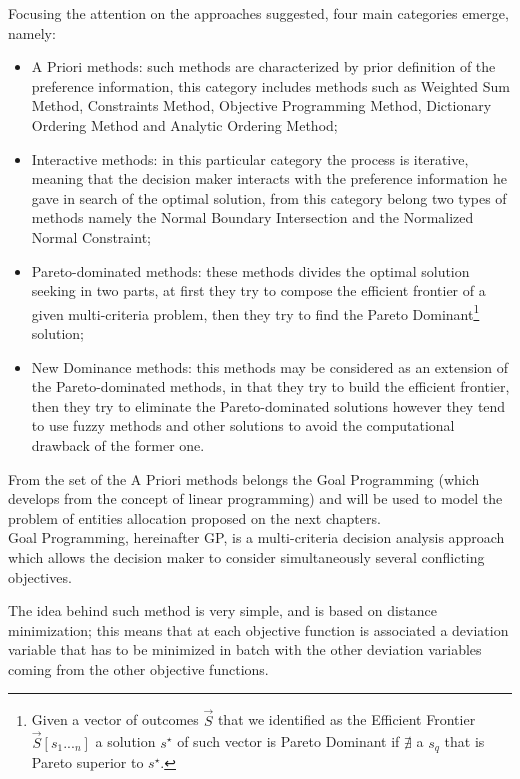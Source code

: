\begin{doublespace}
Focusing the attention on the approaches suggested, four main categories emerge, namely:

\begin{itemize}
	\item A Priori methods: such methods are characterized by prior definition of the preference information, this category includes methods such as Weighted Sum Method, Constraints Method, Objective Programming Method, Dictionary Ordering Method and Analytic Ordering Method;   
	\item Interactive methods: in this particular category the process is iterative, meaning that the decision maker interacts with the preference information he gave in search of the optimal solution, from this category belong two types of methods namely the Normal Boundary Intersection and the Normalized Normal Constraint;
	\item Pareto-dominated methods: these methods divides the optimal solution seeking in two parts, at first they try to compose the efficient frontier of a given multi-criteria problem, then they try to find the Pareto Dominant\footnote{Given a vector of outcomes $\vec{S}$ that we identified as the Efficient Frontier $\vec{S}[s_1..._n]$ a solution $s^{\star}$ of such vector is Pareto Dominant if $\nexists$ a $s_q$ that is Pareto superior to $s^{\star}$.} solution;
	\item New Dominance methods: this methods may be considered as an extension of the Pareto-dominated methods, in that they try to build the efficient frontier, then they try to eliminate the Pareto-dominated solutions however they tend to use fuzzy methods and other solutions to avoid the computational drawback of the former one.  
\end{itemize}

From the set of the A Priori methods belongs the Goal Programming (which develops from the concept of linear programming) and will be used to model the problem of entities allocation proposed on the next chapters.
\\
Goal Programming, hereinafter GP, is a multi-criteria decision analysis approach which allows the decision maker to consider simultaneously several conflicting objectives.

The idea behind such method is very simple, and is based on distance minimization; this means that at each objective function is associated a deviation variable that has to be minimized in batch with the other deviation variables coming from the other objective functions.


\end{doublespace}
